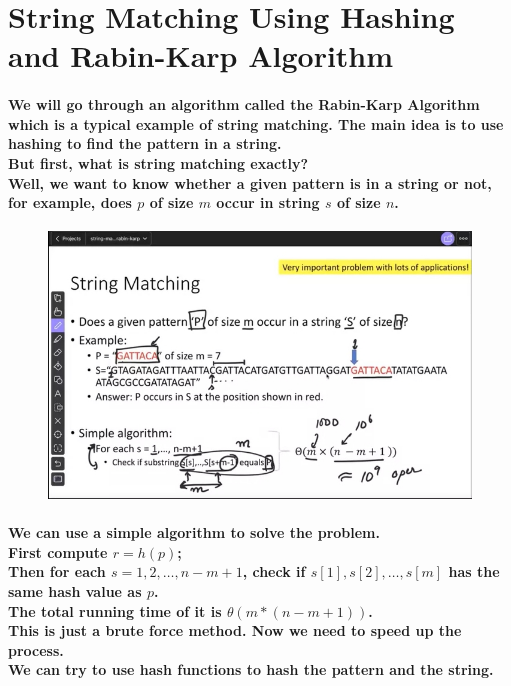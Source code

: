\documentclass{article}
\begin{document}
\section{String Matching Using Hashing and Rabin-Karp Algorithm}

\paragraph{
    We will go through an algorithm called the Rabin-Karp Algorithm which is a typical example of string matching. 
    The main idea is to use hashing to find the pattern in a string.\\
    But first, what is string matching exactly?\\
    Well, we want to know whether a given pattern is in a string or not, for example, does $p$ of size $m$ occur in 
    string $s$ of size $n$.\\
}

\begin{figure}[H]
    \includegraphics[width=\textwidth]{stringmatching.png}
\end{figure}

\paragraph{
    We can use a simple algorithm to solve the problem.\\
    First compute $r=h(p)$;\\
    Then for each $s = 1, 2, \ldots, n-m+1$, check if $s[1], s[2], \ldots, s[m]$ has the same hash value as $p$.\\
    The total running time of it is $\theta(m*(n-m+1))$.\\
    This is just a brute force method. Now we need to speed up the process.\\
    We can try to use hash functions to hash the pattern and the string.\\
}
\end{document}
